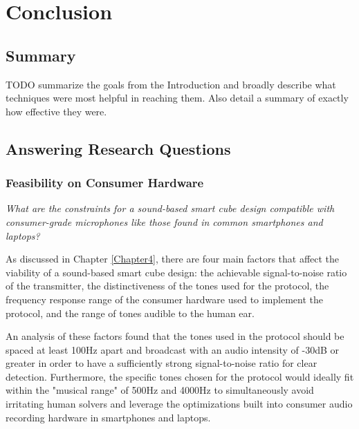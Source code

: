 
\chapter{Conclusion} %

\label{Chapter8} %


\section{Summary}

TODO summarize the goals from the Introduction and broadly describe
what techniques were most helpful in reaching them. Also detail a
summary of exactly how effective they were.

\section{Answering Research Questions}
\label{sec:answering-research-questions}

\subsection{Feasibility on Consumer Hardware}
\label{subsec:answer-feasibility}

\emph{What are the constraints for a sound-based smart cube design
compatible with consumer-grade microphones like those found in common
smartphones and laptops?}

As discussed in Chapter \ref{Chapter4}, there are four main factors
that affect the viability of a sound-based smart cube design: the
achievable signal-to-noise ratio of the transmitter, the
distinctiveness of the tones used for the protocol, the frequency
response range of the consumer hardware used to implement the protocol,
and the range of tones audible to the human ear.

An analysis of these factors found that the tones used in the protocol
should be spaced at least 100Hz apart and broadcast with an audio
intensity of -30dB or greater in order to have a sufficiently strong
signal-to-noise ratio for clear detection. Furthermore, the specific
tones chosen for the protocol would ideally fit within the "musical
range" of 500Hz and 4000Hz to simultaneously avoid irritating human
solvers and leverage the optimizations built into consumer audio
recording hardware in smartphones and laptops.

